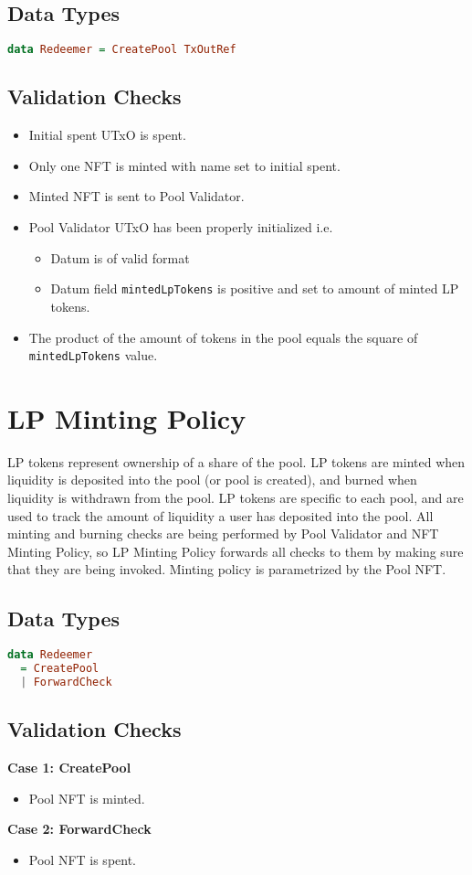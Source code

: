 \documentclass{article}
\begin{document}
\subsection{Data Types}
\begin{lstlisting}[language=Haskell]
data Redeemer = CreatePool TxOutRef
\end{lstlisting}

\subsection{Validation Checks}
\begin{itemize}
  \item Initial spent UTxO is spent.
  \item Only one NFT is minted with name set to initial spent.
  \item Minted NFT is sent to Pool Validator.
  \item Pool Validator UTxO has been properly initialized i.e.
        \begin{itemize}
          \item Datum is of valid format
          \item Datum field \verb|mintedLpTokens| is positive and set to amount of minted LP tokens.
        \end{itemize}
  \item The product of the amount of tokens in the pool equals the square of \verb|mintedLpTokens| value.
\end{itemize}

\section{LP Minting Policy}

LP tokens represent ownership of a share of the pool.
LP tokens are minted when liquidity is deposited into the pool (or pool is created), and burned when liquidity is withdrawn from the pool.
LP tokens are specific to each pool, and are used to track the amount of liquidity a user has deposited into the pool.
All minting and burning checks are being performed by Pool Validator and NFT Minting Policy, so LP Minting Policy forwards all checks to them by making sure that they are being invoked.
Minting policy is parametrized by the Pool NFT.

\subsection{Data Types}
\begin{lstlisting}[language=Haskell]
data Redeemer
  = CreatePool
  | ForwardCheck
\end{lstlisting}

\subsection{Validation Checks}
\hspace{0mm}

\textbf{Case 1: CreatePool}
\begin{itemize}
  \item Pool NFT is minted.
\end{itemize}

\textbf{Case 2: ForwardCheck}
\begin{itemize}
  \item Pool NFT is spent.
\end{itemize}

\nocite{*}

{}
\end{document}
